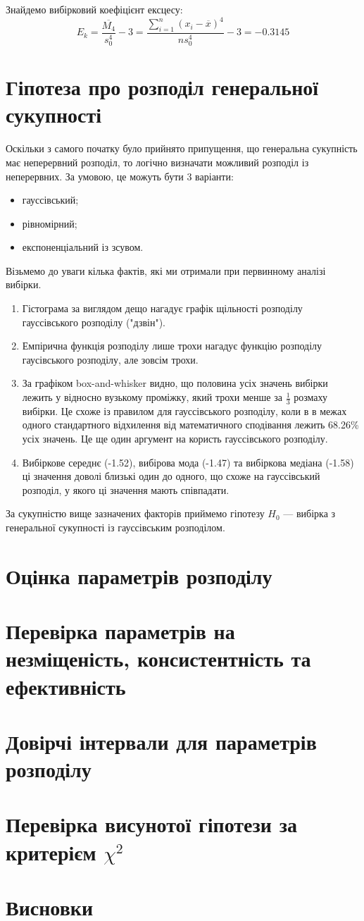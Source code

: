 \documentclass[14pt, a4paper, ukrainian]{extreport}
\begin{document}
	Знайдемо вибірковий коефіцієнт ексцесу:
	$$ E_k = \frac{\overline{M_4}}{s_0^4} - 3= \frac{\sum_{i=1}^{n}(x_i - \overline{x})^4}{ns_0^4} - 3 = -0.3145$$
		
	\chapter{Гіпотеза про розподіл генеральної сукупності}
	
	Оскільки з самого початку було прийнято припущення, що генеральна сукупність має неперервний розподіл, то логічно визначати можливий розподіл із неперервних. За умовою, це можуть бути 3 варіанти:
	\begin{itemize}
		\item гауссівський;
		\item рівномірний;
		\item експоненціальний із зсувом.
	\end{itemize}

	Візьмемо до уваги кілька фактів, які ми отримали при первинному аналізі вибірки.
	\begin{enumerate}
		\item Гістограма за виглядом дещо нагадує графік щільності розподілу гауссівського розподілу ("дзвін").
		\item Емпірична функція розподілу лише трохи нагадує функцію розподілу гаусівського розподілу, але зовсім трохи.
		\item За графіком box-and-whisker видно, що половина усіх значень вибірки лежить у відносно вузькому проміжку, який трохи менше за $\frac{1}{3}$ розмаху вибірки. Це схоже із правилом для гауссівського розподілу, коли в в межах одного стандартного відхилення від математичного сподівання лежить 68.26\% усіх значень. Це ще один аргумент на користь гауссівського розподілу.
		\item Вибіркове середнє (-1.52), вибірова мода (-1.47) та вибіркова медіана (-1.58) ці значення доволі близькі один до одного, що схоже на гауссівський розподіл, у якого ці значення мають співпадати.
	\end{enumerate}
	
	За сукупністю вище зазначених факторів приймемо гіпотезу $H_0$ --- вибірка з генеральної сукупності із гауссівським розподілом.
	
	\chapter{Оцінка параметрів розподілу}
	\chapter{Перевірка параметрів на незміщеність, консистентність та ефективність}
	\chapter{Довірчі інтервали для параметрів розподілу}
	\chapter{Перевірка висунотої гіпотези за критерієм $\chi^2$}
	\chapter*{Висновки}
	
	
\end{document}
